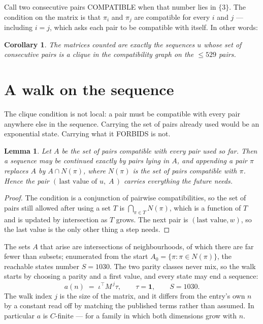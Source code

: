 \documentclass[11pt,a4paper]{article}
\theoremstyle{plain}
\newtheorem{lemma}[theorem]{Lemma}
\newtheorem{corollary}[theorem]{Corollary}
\theoremstyle{definition}
\begin{document}
Call two consecutive pairs COMPATIBLE when that number lies in $\{3\}$. The condition on the
matrix is that $\pi_i$ and $\pi_j$ are compatible for every $i$ and $j$ --- including $i=j$,
which asks each pair to be compatible with itself. In other words:

\begin{corollary}
The matrices counted are exactly the sequences $u$ whose set of consecutive pairs is a clique in
the compatibility graph on the $\le 529$ pairs.
\end{corollary}

\section{A walk on the sequence}

The clique condition is not local: a pair must be compatible with every pair anywhere else in
the sequence. Carrying the set of pairs already used would be an exponential state. Carrying
what it FORBIDS is not.

\begin{lemma}\label{lem:lump}
Let $A$ be the set of pairs compatible with every pair used so far. Then a sequence may be
continued exactly by pairs lying in $A$, and appending a pair $\pi$ replaces $A$ by
$A\cap N(\pi)$, where $N(\pi)$ is the set of pairs compatible with $\pi$. Hence the pair
$(\,\text{last value of }u,\;A\,)$ carries everything the future needs.
\end{lemma}

\begin{proof}
The condition is a conjunction of pairwise compatibilities, so the set of pairs still allowed
after using a set $T$ is $\bigcap_{\pi\in T}N(\pi)$, which is a function of $T$ and is updated
by intersection as $T$ grows. The next pair is $(\text{last value},w)$, so the last value is
the only other thing a step needs.
\end{proof}

The sets $A$ that arise are intersections of neighbourhoods, of which there are far fewer than
subsets; enumerated from the start $A_0=\{\pi:\pi\in N(\pi)\}$, the reachable states number
$S=1030$. The two parity classes never mix, so the walk starts by choosing a parity and a first
value, and every state may end a sequence:
\[
a(n)\;=\;\iota^{\!\top}M^{\,j}\tau ,\qquad \tau=\mathbf{1},\qquad S=1030.
\]
The walk index $j$ is the size of the matrix, and it differs from the entry's own $n$ by a
constant read off by matching the published terms rather than assumed. In particular $a$ is
$C$-finite --- for a family in which both dimensions grow with $n$.
\end{document}
